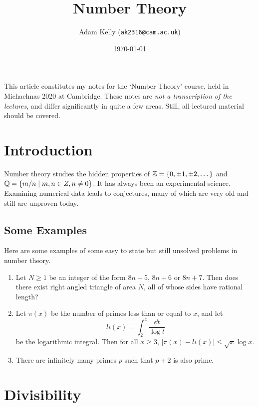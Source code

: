 \documentclass[a4paper]{scrartcl}
\title{Number Theory}
\author{Adam Kelly (\texttt{ak2316@cam.ac.uk})}
\date{\today}
\begin{document}
\maketitle


This article constitutes my notes for the `Number Theory' course, held in Michaelmas 2020 at Cambridge. These notes are \emph{not a transcription of the lectures}, and differ significantly in quite a few areas. Still, all lectured material should be covered.



\tableofcontents

\section{Introduction}

Number theory studies the hidden properties of $\mathbb{Z} = \{0, \pm 1, \pm 2, \dots\}$ and $\mathbb{Q} =\{m/n \mid m, n \in Z, n \neq 0 \}$. It has always been an experimental science. Examining numerical data leads to conjectures, many of which are very old and still are unproven today.

\subsection{Some Examples}

Here are some examples of some easy to state but still unsolved problems in number theory.

\begin{enumerate}
  \item Let $N \geq 1$ be an integer of the form $8n + 5$, $8n + 6$ or $8n + 7$. Then does there exist right angled triangle of area $N$, all of whose sides have rational length?
  \item Let $\pi(x)$ be the number of primes less than or equal to $x$, and let
  $$
  li(x) = \int_2^x \frac{\dd t}{\log t}
  $$
  be the logarithmic integral. Then for all $x \geq 3$, $|\pi(x) - li(x)| \leq \sqrt{x} \log x$.
  \item There are infinitely many primes $p$ such that $p + 2$ is also prime.
\end{enumerate}

\section{Divisibility} 
\end{document}
